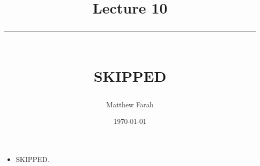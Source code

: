 \documentclass{article}
\date{
	\vspace{-.75em}
	{\large \today}
}
\title{
	\vspace*{-1.5em}
	{\Huge Lecture 10} \\
	\vspace{-1em}
	\rule{\textwidth/4}{.01em} \\
	\vspace{-.25em}
	{\Large SKIPPED}
	\vspace{-.75em}
}
\author{
	{\large Matthew Farah}
}
\begin{document}
\maketitle
\pagestyle{fancy}

\fi

\begin{itemize}
	\item SKIPPED.
\end{itemize}

\ifdefined\iscombined
	\newpage
\else
	
\end{document}
